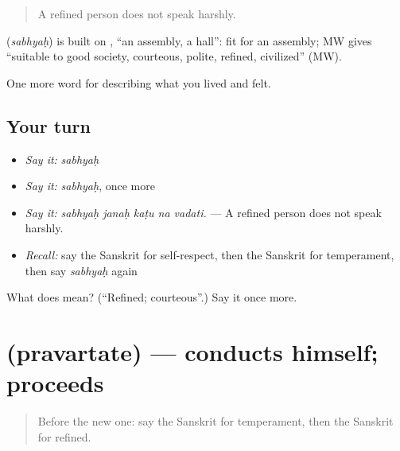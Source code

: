 \begin{quote}
A refined person does not speak harshly.
\end{quote}

\begin{cousinweb}
\textbf{} (\emph{sabhyaḥ}) is built on \textbf{}, \textquotedblleft{}an assembly, a hall\textquotedblright{}: fit for an assembly; MW gives \textquotedblleft{}suitable to good society, courteous, polite, refined, civilized\textquotedblright{} (MW).
\end{cousinweb}

\begin{grammarlens}[title={What you've built}]
One more word for describing what you lived and felt.
\end{grammarlens}

\subsection*{Your turn}
\begin{itemize}
\raggedright
  \item \emph{Say it:} \emph{sabhyaḥ}
  \item \emph{Say it:} \emph{sabhyaḥ}, once more
  \item \emph{Say it:} \emph{sabhyaḥ janaḥ kaṭu na vadati.} — A refined person does not speak harshly.
  \item \emph{Recall:} say the Sanskrit for self-respect, then the Sanskrit for temperament, then say \emph{sabhyaḥ} again
\end{itemize}

\begin{tcolorbox}[breakable,colback=teal!4,colframe=teal!35!black,title={Before you move on}]
What does  mean? (\textquotedblleft{}Refined; courteous\textquotedblright{}.) Say it once more.
\end{tcolorbox}
\section[\texorpdfstring{\sk{प्रवर्तते} (pravartate)}{प्रवर्तते (pravartate)}]{ (pravartate) — conducts himself; proceeds}

\label{lesson:SA-C460-pravartate}



\begin{quote}
Before the new one: say the Sanskrit for temperament, then the Sanskrit for refined.
\end{quote}

